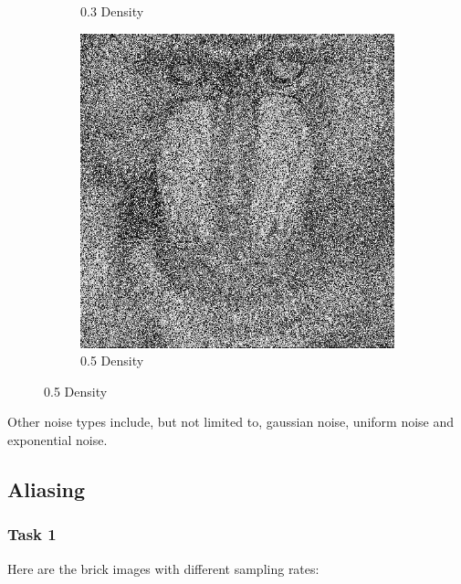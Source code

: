 \documentclass{article}
\begin{document}
\begin{figure}[h]
\begin{subfigure}[b]{0.3\textwidth}
		\caption{0.3 Density}
		\label{fig:Mandrill03.png}
	\end{subfigure}
	\begin{subfigure}[b]{0.3\textwidth}
		\includegraphics[width = \textwidth]{Mandrill05.png}
		\caption{0.5 Density}
		\label {fig:Mandrill05.png}
	\end{subfigure}
\end{figure}

Other noise types include, but not limited to, gaussian noise, uniform noise and exponential noise.

\newpage
\subsection{Aliasing}
\subsubsection*{Task 1}
Here are the brick images with different sampling rates:\\
\end{document}
